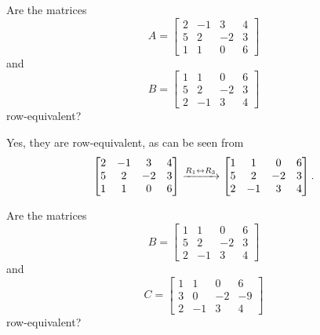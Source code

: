 \documentclass{ximera}
\begin{document}
\begin{example}
  Are the matrices
  \[
    A=\begin{bmatrix}
      2&-1&3&4\\
      5&2&-2&3\\
      1&1&0&6
    \end{bmatrix}
  \]
  and
  \[
    B=\begin{bmatrix}
      1&1&0&6\\
      5&2&-2&3\\
      2&-1&3&4
    \end{bmatrix}
  \]
  row-equivalent?
  
  \begin{multipleChoice}
  \end{multipleChoice}
  
  \begin{feedback}
    Yes, they are row-equivalent, as can be seen from
    \[
      \begin{bmatrix}
        2&-1&3&4\\
        5&2&-2&3\\
        1&1&0&6
      \end{bmatrix}
      \xrightarrow{R_{1}\leftrightarrow R_{3}}
      \begin{bmatrix}
        1&1&0&6\\
        5&2&-2&3\\
        2&-1&3&4
      \end{bmatrix}.
    \]
  \end{feedback}

  \begin{question}
    Are the matrices
    \[
      B= \begin{bmatrix}
        1&1&0&6\\
        5&2&-2&3\\
        2&-1&3&4
      \end{bmatrix}
    \]
    and
    \[
      C = \begin{bmatrix}
        1&1&0&6\\
        3&0&-2&-9\\
        2&-1&3&4
      \end{bmatrix}
    \]
    row-equivalent?
    
    \begin{multipleChoice}
    \end{multipleChoice}
    

\end{question}
\end{example}
\end{document}
